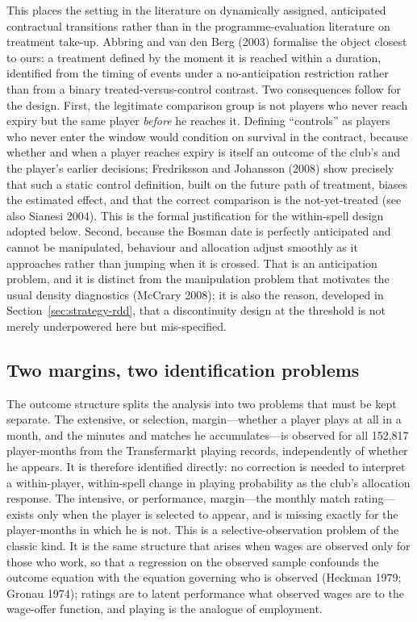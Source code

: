 This places the setting in the literature on dynamically assigned, anticipated
contractual transitions rather than in the programme-evaluation literature on
treatment take-up. Abbring and van den Berg (2003) formalise the object closest to
ours: a treatment defined by the moment it is reached within a duration, identified
from the timing of events under a no-anticipation restriction rather than from a
binary treated-versus-control contrast. Two consequences follow for the design.
First, the legitimate comparison group is not players who never reach expiry but
the same player \emph{before} he reaches it. Defining ``controls'' as players who
never enter the window would condition on survival in the contract, because
whether and when a player reaches expiry is itself an outcome of the club's and the
player's earlier decisions; Fredriksson and Johansson (2008) show precisely that
such a static control definition, built on the future path of treatment, biases the
estimated effect, and that the correct comparison is the not-yet-treated (see also
Sianesi 2004). This is the formal justification for the within-spell design adopted
below. Second, because the Bosman date is perfectly anticipated and cannot be
manipulated, behaviour and allocation adjust smoothly as it approaches rather than
jumping when it is crossed. That is an anticipation problem, and it is distinct
from the manipulation problem that motivates the usual density diagnostics
(McCrary 2008); it is also the reason, developed in
Section~\ref{sec:strategy-rdd}, that a discontinuity design at the threshold is not
merely underpowered here but mis-specified.

\subsection{Two margins, two identification problems}
\label{sec:strategy-margins}

The outcome structure splits the analysis into two problems that must be kept
separate. The extensive, or selection, margin---whether a player plays at all in a
month, and the minutes and matches he accumulates---is observed for all 152{,}817
player-months from the Transfermarkt playing records, independently of whether he
appears. It is therefore identified directly: no correction is needed to interpret
a within-player, within-spell change in playing probability as the club's
allocation response. The intensive, or performance, margin---the monthly match
rating---exists only when the player is selected to appear, and is missing exactly
for the player-months in which he is not. This is a selective-observation problem
of the classic kind. It is the same structure that arises when wages are observed
only for those who work, so that a regression on the observed sample confounds the
outcome equation with the equation governing who is observed (Heckman 1979; Gronau
1974); ratings are to latent performance what observed wages are to the wage-offer
function, and playing is the analogue of employment.

